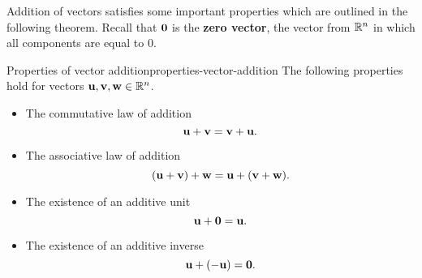 Addition of vectors satisfies some important properties which are
outlined in the following theorem.  Recall that $\vect{0}$ is the
\textbf{zero vector}, the vector
from $\mathbb{R}^n$ in which all components are equal to $0$.

\begin{theorem}{Properties of vector addition}{properties-vector-addition}
  The following properties hold for vectors
  $\vect{u},\vect{v},\vect{w}\in\R^n$.%
  \begin{itemize}
  \item The commutative law of addition%
    \begin{equation*}
      \vect{u}+\vect{v}=\vect{v}+\vect{u}.
    \end{equation*}
  \item The associative law of addition
    \begin{equation*}
      (\vect{u}+\vect{v}) +\vect{w}=\vect{u}+(\vect{v}+\vect{w}).
    \end{equation*}
  \item The existence of an additive unit%
    \begin{equation*}
      \vect{u}+\vect{0}=\vect{u}.
    \end{equation*}
  \item The existence of an additive inverse
    \begin{equation*}
      \vect{u}+(-\vect{u}) =\vect{0}.
    \end{equation*}
  \end{itemize}
\end{theorem}

